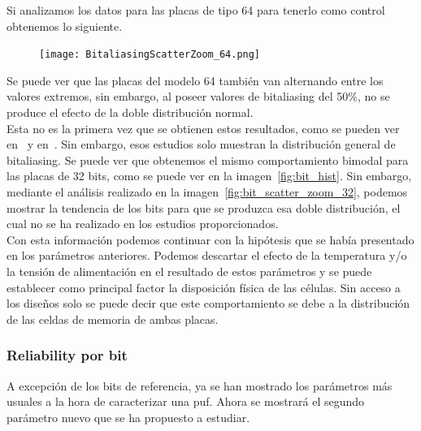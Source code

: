 \documentclass[spanish]{template/minim}
\begin{document}
Si analizamos los datos para las placas de tipo 64 para tenerlo como control obtenemos lo siguiente.

\begin{figure}[H]
    \centering
    \texttt{[image: BitaliasingScatterZoom\_64.png]}
\end{figure}

Se puede ver que las placas del modelo 64 también van alternando entre los valores extremos, sin embargo, al poseer valores de bitaliasing del 50\%, no se produce el efecto de la doble distribución normal.\\

Esta no es la primera vez que se obtienen estos resultados, como se pueden ver en~\cite{90nm} y en~\cite{sram_xmc}. Sin embargo, esos estudios solo muestran la distribución general de bitaliasing. Se puede ver que obtenemos el mismo comportamiento bimodal para las placas de 32 bits, como se puede ver en la imagen~\ref{fig:bit_hist}. Sin embargo, mediante el análisis realizado en la imagen~\ref{fig:bit_scatter_zoom_32}, podemos mostrar la tendencia de los bits para que se produzca esa doble distribución, el cual no se ha realizado en los estudios proporcionados.\\

Con esta información podemos continuar con la hipótesis que se había presentado en los parámetros anteriores. Podemos descartar el efecto de la temperatura y/o la tensión de alimentación en el resultado de estos parámetros y se puede establecer como principal factor la disposición física de las células. Sin acceso a los diseños solo se puede decir que este comportamiento se debe a la distribución de las celdas de memoria de ambas placas.\\


\subsubsection{Reliability por bit}\label{sec:rpb}

A excepción de los bits de referencia, ya se han mostrado los parámetros más usuales a la hora de caracterizar una \gls{puf}. Ahora se mostrará el segundo parámetro nuevo que se ha propuesto a estudiar.\\
\end{document}
